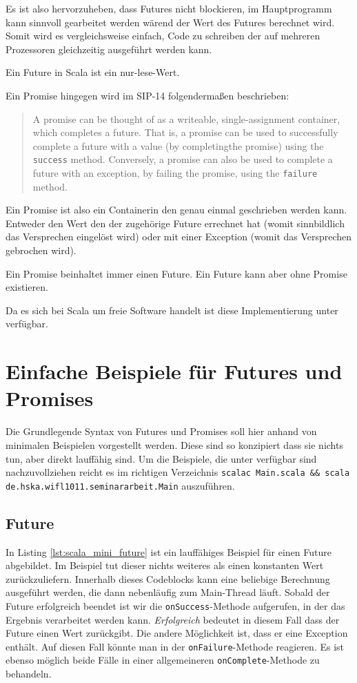 \documentclass[11pt,a4paper,titlepage,ngerman]{scrartcl}
\begin{document}
Es ist also hervorzuheben, dass Futures nicht blockieren, im Hauptprogramm
kann sinnvoll gearbeitet werden wärend der Wert des Futures berechnet wird.
Somit wird es vergleichsweise einfach, Code zu schreiben der auf mehreren
Prozessoren gleichzeitig ausgeführt werden kann.

Ein Future in Scala ist ein nur-lese-Wert.

Ein Promise hingegen wird im SIP-14 folgendermaßen beschrieben:
\begin{quote}
A promise can be thought of as a writeable, single-assignment container, which 
completes a future. That is, a promise can be used to successfully complete a 
future with a value (by \glqq completing\grqq the promise) using the \texttt{success} method. 
Conversely, a promise can also be used to complete a future with an exception, 
by failing the promise, using the \texttt{failure} method.
\end{quote}

Ein Promise ist also ein \glqq Container\grqq in den genau einmal geschrieben
werden kann. Entweder den Wert den der zugehörige Future errechnet hat
(womit sinnbildlich das Versprechen eingelöst wird) oder mit einer Exception
(womit das Versprechen gebrochen wird).

Ein Promise beinhaltet immer einen Future. Ein Future kann aber ohne Promise
existieren.

Da es sich bei Scala um freie Software handelt ist diese Implementierung
unter \cite{scalaConcurrentCode} verfügbar.

\section{Einfache Beispiele für Futures und Promises}

Die Grundlegende Syntax von Futures und Promises soll hier anhand von minimalen
Beispielen vorgestellt werden. Diese sind so konzipiert dass sie nichts
tun, aber direkt lauffähig sind. Um die Beispiele, die unter \cite{code}
verfügbar sind nachzuvollziehen reicht es im richtigen Verzeichnis 
\texttt{scalac Main.scala \&\& scala de.hska.wifl1011.seminararbeit.Main} auszuführen.

\subsection{Future}

In Listing \ref{lst:scala_mini_future} ist ein lauffähiges Beispiel für einen 
Future abgebildet. Im Beispiel tut dieser nichts weiteres als einen konstanten
Wert zurückzuliefern. Innerhalb dieses Codeblocks kann eine beliebige Berechnung
ausgeführt werden, die dann nebenläufig zum Main-Thread läuft. Sobald der Future
erfolgreich beendet ist wir die \texttt{onSuccess}-Methode aufgerufen, in der
das Ergebnis verarbeitet werden kann. \emph{Erfolgreich} bedeutet in diesem
Fall dass der Future einen Wert zurückgibt. Die andere Möglichkeit ist, dass
er eine Exception enthält. Auf diesen Fall könnte man in der \texttt{onFailure}-Methode
reagieren. Es ist ebenso möglich beide Fälle in einer allgemeineren
\texttt{onComplete}-Methode zu behandeln.
\end{document}
